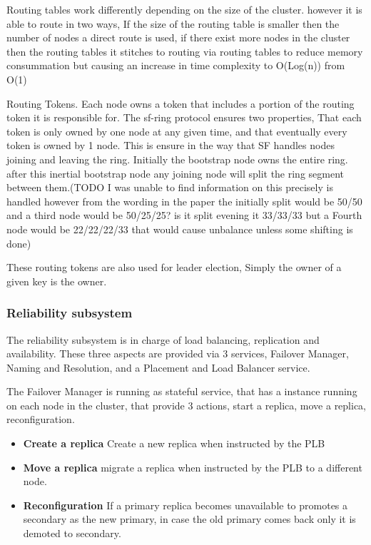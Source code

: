 \documentclass[a4paper,10pt,titlepage]{report}
\begin{document}
Routing tables work differently depending on the size of the cluster. however it is able to route in two ways, If the size of the routing table is smaller then the number of nodes a direct route is used, if there exist more nodes in the cluster then the routing tables it stitches to routing via routing tables to reduce memory consummation but causing an increase in time complexity to O(Log(n)) from O(1)\\
\vspace{5mm}

Routing Tokens.
Each node owns a token that includes a portion of the routing token it is responsible for. The sf-ring protocol ensures two properties, That each token is only owned by one node at any given time, and that eventually every token is owned by 1 node. This is ensure in the way that SF handles nodes joining and leaving the ring. Initially the bootstrap node owns the entire ring. after this inertial bootstrap node any joining node will split the ring segment between them.(TODO I was unable to find information on this precisely is handled however from the wording in the paper the initially split would be 50/50 and a third node would be 50/25/25?  is it split evening it 33/33/33 but a Fourth node would be 22/22/22/33 that would cause unbalance unless some shifting is done)\\
\vspace{5mm}


These routing tokens are also used for leader election, Simply the owner of a given key is the owner.

\subsubsection{Reliability subsystem}
The reliability subsystem is in charge of load balancing, replication and availability. These three aspects are provided via 3 services, Failover Manager, Naming and Resolution, and a Placement and Load Balancer service.\\
\vspace{5mm}

The Failover Manager is running as stateful service, that has a instance running on each node in the cluster, that provide 3 actions, start a replica, move a replica, reconfiguration.\\
\vspace{5mm}

\begin{itemize}
\item \textbf{Create a replica} Create a new replica when instructed by the PLB
\item \textbf{Move a replica} migrate a replica when instructed by the PLB to a different node.
    \item \textbf{Reconfiguration} If a primary replica becomes unavailable to promotes a secondary as the new primary, in case the old primary comes back only it is demoted to secondary. 
\end{itemize}
\end{document}
